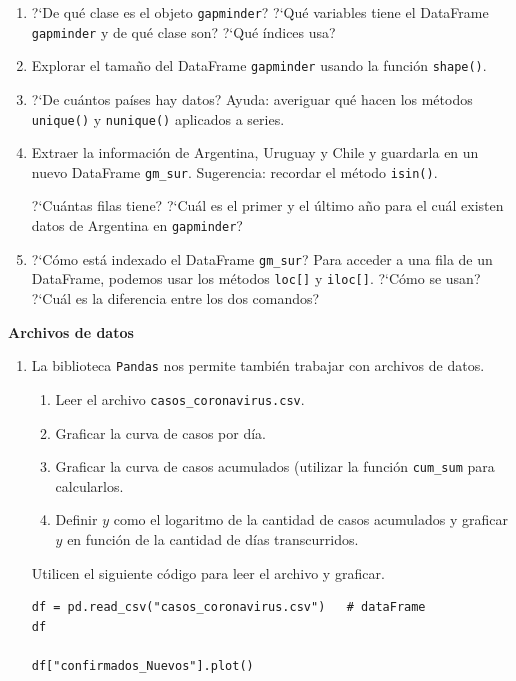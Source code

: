 \documentclass[a4paper,11pt]{article}
\theoremstyle{definition}
\begin{document}
\begin{enumerate}[resume]
\item ?`De qu\'e clase es el objeto \lstinline{gapminder}? ?`Qu\'e variables tiene el DataFrame \lstinline{gapminder} y de qu\'e clase son? ?`Qu\'e \'indices usa?

\item Explorar el tama\~no del DataFrame \lstinline{gapminder} usando la funci\'on \lstinline{shape()}.

\item ?`De cu\'antos pa\'ises hay datos? Ayuda: averiguar qu\'e hacen los m\'etodos \lstinline{unique()} y \lstinline{nunique()} aplicados a series.



\item Extraer la informaci\'on de Argentina, Uruguay y Chile y guardarla en un nuevo DataFrame \lstinline{gm_sur}. Sugerencia: recordar el m\'etodo \lstinline{isin()}.

?`Cu\'antas filas tiene? ?`Cu\'al es el primer y el \'ultimo a\~no para el cu\'al existen datos de Argentina en \lstinline{gapminder}?

\item ?`C\'omo est\'a indexado el DataFrame \lstinline{gm_sur}? Para acceder a una fila de un DataFrame, podemos usar los m\'etodos \lstinline{loc[]} y \lstinline{iloc[]}. ?`C\'omo se usan? ?`Cu\'al es la diferencia entre los dos comandos?


\end{enumerate}

\textbf{\large Archivos de datos}

\begin{enumerate}[resume]
\item La biblioteca \lstinline{Pandas} nos permite tambi\'en trabajar con archivos de datos.

\begin{enumerate}
\item Leer el archivo \lstinline{casos_coronavirus.csv}.
\item Graficar la curva de casos por d\'ia.
\item Graficar la curva de casos acumulados (utilizar la funci\'on \lstinline{cum_sum} para calcularlos.
\item Definir $y$ como el logaritmo de la cantidad de casos acumulados y graficar $y$ en funci\'on de la cantidad de d\'ias transcurridos.
\end{enumerate}
Utilicen el siguiente c\'odigo para leer el archivo y graficar.

\begin{lstlisting}
df = pd.read_csv("casos_coronavirus.csv")   # dataFrame
df

df["confirmados_Nuevos"].plot()
\end{lstlisting}

\end{enumerate}
\end{document}
